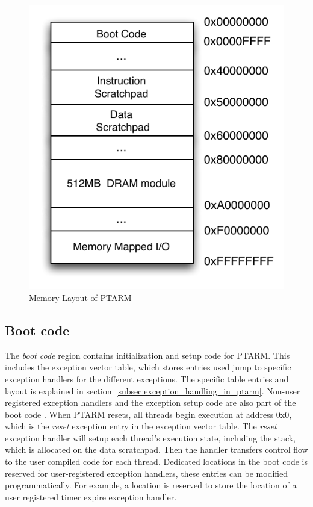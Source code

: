 \begin{figure}
  \vspace{-30pt}
  \begin{center}
    \includegraphics[scale=.65]{figs/ptarm_memory_layout}
  \end{center}
  \vspace{-5mm}
  \caption{Memory Layout of PTARM}
  \label{fig:ptarm_memory_layout}
\end{figure} 

\subsection{Boot code}
The \emph{boot code} region contains initialization and setup code for PTARM. 
This includes the exception vector table, which stores entries used jump to specific exception handlers for the different exceptions.
The specific table entries and layout is explained in section~\ref{subsec:exception_handling_in_ptarm}. 
Non-user registered exception handlers and the exception setup code are also part of the boot code .
When PTARM resets, all threads begin execution at address 0x0, which is the \emph{reset} exception entry in the exception vector table.
The \emph{reset} exception handler will setup each thread's execution state, including the stack, which is allocated on the data scratchpad.
Then the handler transfers control flow to the user compiled code for each thread.  
Dedicated locations in the boot code is reserved for user-registered exception handlers, these entries can be modified programmatically. 
For example, a location is reserved to store the location of a user registered timer expire exception handler.

